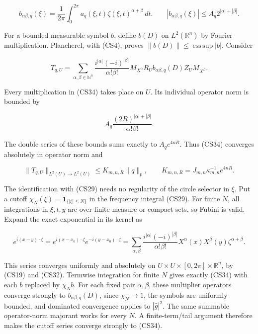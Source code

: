 \documentclass[
  11pt,
]{article}
\begin{document}
\[
 b_{\alpha\beta,q}(\xi)=\frac1{2\pi}\int_0^{2\pi}
          a_q(\xi,t)\zeta(\xi,t)^{\alpha+\beta}\,dt.
 \qquad |b_{\alpha\beta,q}(\xi)|
                  \leq A_q2^{|\alpha|+|\beta|}.                \tag{CS33}
\]

For a bounded measurable symbol \(b\), define \(b(D)\) on
\(L^2(\mathbb R^n)\) by Fourier multiplication. Plancherel, with (CS4),
proves \(\|b(D)\|\leq\operatorname*{ess\,sup}|b|\). Consider

\[
 T_{q,U}=
  \sum_{\alpha,\beta\in\mathbb N^n}
       \frac{i^{|\alpha|}(-i)^{|\beta|}}{\alpha!\beta!}
       M_{X^\alpha}R_U b_{\alpha\beta,q}(D)
                                      Z_U M_{X^\beta}.        \tag{CS34}
\]

Every multiplication in (CS34) takes place on \(U\). Its individual
operator norm is bounded by

\[
 A_q\frac{(2R)^{|\alpha|+|\beta|}}{\alpha!\beta!}.
\]

The double series of these bounds sums exactly to \(A_qe^{4nR}\). Thus
(CS34) converges absolutely in operator norm and

\[
 \|T_{q,U}\|_{L^2(U)\to L^2(U)}
 \leq K_{m,n,R}\|q\|_p,
 \qquad K_{m,n,R}=J_{m,n}\kappa_{m,n}^{-1}e^{4nR}.             \tag{CS35}
\]

The identification with (CS29) needs no regularity of the circle
selector in \(\xi\). Put a cutoff
\(\chi_N(\xi)=\mathbf1_{\{|\xi|\leq N\}}\) in the frequency integral
(CS29). For finite \(N\), all integrations in \(\xi,t,y\) are over
finite measure or compact sets, so Fubini is valid. Expand the exact
exponential in its kernel as

\[
 e^{i(x-y)\cdot\zeta}
 =e^{i(x-x_0)\cdot\zeta}e^{-i(y-x_0)\cdot\zeta}
 =\sum_{\alpha,\beta}
    \frac{i^{|\alpha|}(-i)^{|\beta|}}{\alpha!\beta!}
    X^\alpha(x)X^\beta(y)\zeta^{\alpha+\beta}.                 \tag{CS36}
\]

This series converges uniformly and absolutely on
\(U\times U\times[0,2\pi]\times\mathbb R^n\), by (CS19) and (CS32).
Termwise integration for finite \(N\) gives exactly (CS34) with each
\(b\) replaced by \(\chi_N b\). For each fixed pair \(\alpha,\beta\),
these multiplier operators converge strongly to
\(b_{\alpha\beta,q}(D)\), since \(\chi_N\to1\), the symbols are
uniformly bounded, and dominated convergence applies to
\(|\widehat g|^2\). The same summable operator-norm majorant works for
every \(N\). A finite-term/tail argument therefore makes the cutoff
series converge strongly to (CS34).
\end{document}
